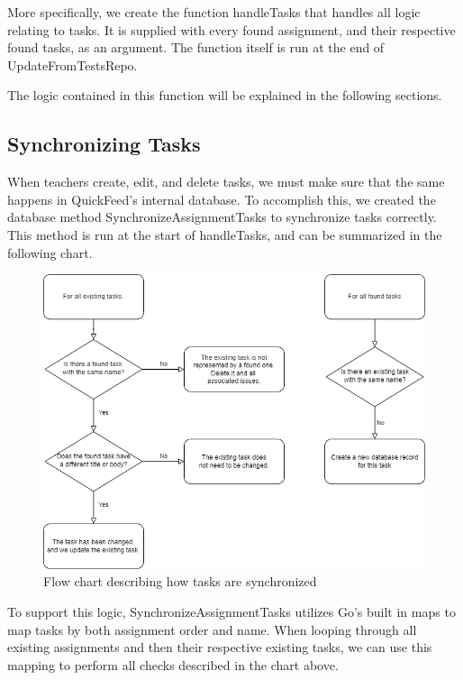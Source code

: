 More specifically, we create the function handleTasks that handles all logic relating to tasks.
It is supplied with every found assignment, and their respective found tasks, as an argument.
The function itself is run at the end of UpdateFromTestsRepo.



The logic contained in this function will be explained in the following sections.

\subsection{Synchronizing Tasks}

When teachers create, edit, and delete tasks, we must make sure that the same happens in QuickFeed's internal database.
To accomplish this, we created the database method SynchronizeAssignmentTasks to synchronize tasks correctly.
This method is run at the start of handleTasks, and can be summarized in the following chart.

\begin{figure}[ht]
    \centering
    \includegraphics[width=\textwidth]{photos/synchronize-tasks-flow-chart.png}
    \caption{Flow chart describing how tasks are synchronized}
    \label{fig:synchronize-tasks-flow-chart}
\end{figure}

To support this logic, SynchronizeAssignmentTasks utilizes Go's built in maps to map tasks by both assignment order and name.
When looping through all existing assignments and then their respective existing tasks, we can use this mapping to perform all checks described in the chart above.


